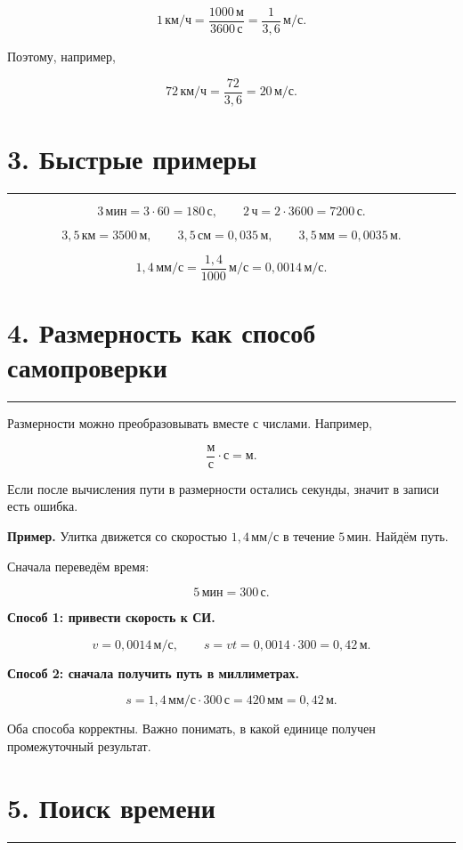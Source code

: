 \documentclass[a4paper,12pt]{article}
\newcommand{\sectionline}{%
  \par\vspace{0.15em}%
  \noindent\textcolor{lightaccent}{\rule{\linewidth}{0.7pt}}%
  \par\vspace{0.35em}%
}
\newcommand{\unit}[1]{\,\text{#1}}
\begin{document}
\[
  1\unit{км/ч}
  =
  \frac{1000\unit{м}}{3600\unit{с}}
  =
  \frac{1}{3{,}6}\unit{м/с}.
\]

Поэтому, например,

\[
  72\unit{км/ч}
  =
  \frac{72}{3{,}6}
  =
  20\unit{м/с}.
\]

\section*{3. Быстрые примеры}
\sectionline

\[
  3\unit{мин}
  =
  3\cdot60
  =
  180\unit{с},
  \qquad
  2\unit{ч}
  =
  2\cdot3600
  =
  7200\unit{с}.
\]

\[
  3{,}5\unit{км}
  =
  3500\unit{м},
  \qquad
  3{,}5\unit{см}
  =
  0{,}035\unit{м},
  \qquad
  3{,}5\unit{мм}
  =
  0{,}0035\unit{м}.
\]

\[
  1{,}4\unit{мм/с}
  =
  \frac{1{,}4}{1000}\unit{м/с}
  =
  0{,}0014\unit{м/с}.
\]

\section*{4. Размерность как способ самопроверки}
\sectionline

Размерности можно преобразовывать вместе с числами. Например,

\[
  \frac{\text{м}}{\text{с}}\cdot\text{с}
  =
  \text{м}.
\]

Если после вычисления пути в размерности остались секунды,
значит в записи есть ошибка.

\textbf{Пример.}
Улитка движется со скоростью
$1{,}4\unit{мм/с}$
в течение
$5\unit{мин}$.
Найдём путь.

Сначала переведём время:

\[
  5\unit{мин}
  =
  300\unit{с}.
\]

\textbf{Способ 1: привести скорость к СИ.}

\[
  v
  =
  0{,}0014\unit{м/с},
  \qquad
  s
  =
  vt
  =
  0{,}0014\cdot300
  =
  0{,}42\unit{м}.
\]

\textbf{Способ 2: сначала получить путь в миллиметрах.}

\[
  s
  =
  1{,}4\unit{мм/с}\cdot300\unit{с}
  =
  420\unit{мм}
  =
  0{,}42\unit{м}.
\]

Оба способа корректны.
Важно понимать,
в какой единице получен промежуточный результат.

\section*{5. Поиск времени}
\sectionline
\end{document}
